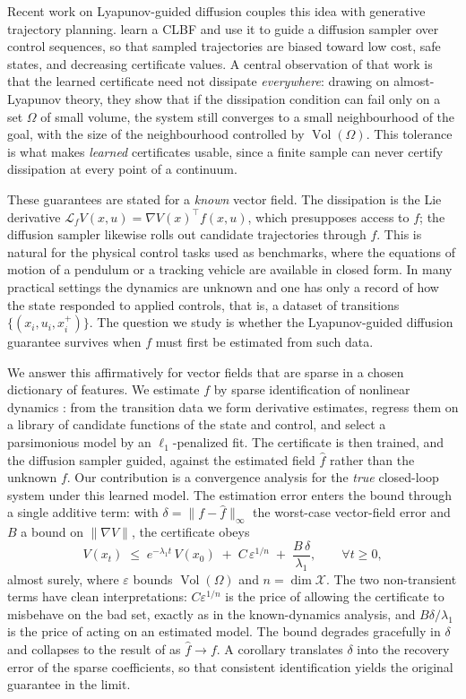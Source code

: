 \documentclass{article}
\newcommand{\eps}{\varepsilon}
\newcommand{\Lie}[2]{\mathcal{L}_{#1} #2}
\newcommand{\hf}{\hat{f}}
\newcommand{\Vol}{\operatorname{Vol}}
\begin{document}
Recent work on Lyapunov-guided diffusion couples this idea with generative
trajectory planning. \citet{cheng2026safe} learn a CLBF and use it to guide a
diffusion sampler over control sequences, so that sampled trajectories are biased
toward low cost, safe states, and decreasing certificate values. A central
observation of that work is that the learned certificate need not dissipate
\emph{everywhere}: drawing on almost-Lyapunov theory, they show that if the
dissipation condition can fail only on a set $\Omega$ of small volume, the
system still converges to a small neighbourhood of the goal, with the size of the
neighbourhood controlled by $\Vol(\Omega)$. This tolerance is what makes
\emph{learned} certificates usable, since a finite sample can never certify
dissipation at every point of a continuum.

These guarantees are stated for a \emph{known} vector field. The dissipation is
the Lie derivative $\Lie{f}{V}(x,u)=\nabla V(x)^\top f(x,u)$, which presupposes
access to $f$; the diffusion sampler likewise rolls out candidate trajectories
through $f$. This is natural for the physical control tasks used as benchmarks,
where the equations of motion of a pendulum or a tracking vehicle are available
in closed form. In many practical settings the dynamics are unknown and one has
only a record of how the state responded to applied controls, that is, a dataset
of transitions $\{(x_i,u_i,x_i^+)\}$. The question we study is whether the
Lyapunov-guided diffusion guarantee survives when $f$ must first be estimated
from such data.

We answer this affirmatively for vector fields that are sparse in a chosen
dictionary of features. We estimate $f$ by sparse identification of nonlinear
dynamics \citep{brunton2016discovering}: from the transition data we form
derivative estimates, regress them on a library of candidate functions of the
state and control, and select a parsimonious model by an $\ell_1$-penalized fit.
The certificate is then trained, and the diffusion sampler guided, against the
estimated field $\hf$ rather than the unknown $f$. Our contribution is a
convergence analysis for the \emph{true} closed-loop system under this learned
model. The estimation error enters the bound through a single additive term: with
$\delta=\|f-\hf\|_\infty$ the worst-case vector-field error and $B$ a bound on
$\|\nabla V\|$, the certificate obeys
\[
    V(x_t)\;\le\; e^{-\lambda_1 t}\,V(x_0)\;+\;C\,\eps^{1/n}\;+\;\frac{B\,\delta}{\lambda_1},
    \qquad \forall t\ge 0,
\]
almost surely, where $\eps$ bounds $\Vol(\Omega)$ and $n=\dim\mathcal{X}$. The two
non-transient terms have clean interpretations: $C\eps^{1/n}$ is the price of
allowing the certificate to misbehave on the bad set, exactly as in the
known-dynamics analysis, and $B\delta/\lambda_1$ is the price of acting on an
estimated model. The bound degrades gracefully in $\delta$ and collapses to the
result of \citet{cheng2026safe} as $\hf\to f$. A corollary translates $\delta$
into the recovery error of the sparse coefficients, so that consistent
identification yields the original guarantee in the limit.
\end{document}
